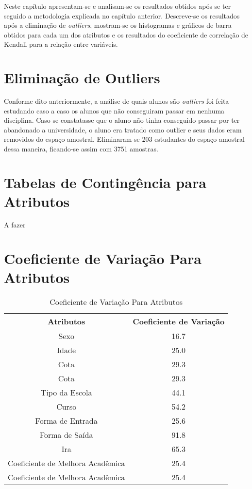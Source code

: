 Neste capítulo apresentam-se e analisam-se os resultados obtidos após se ter seguido a
metodologia explicada no capítulo anterior. Descreve-se os resultados após a
eliminação de \textit{outliers}, mostram-se os histogramas e gráficos de barra obtidos para
cada um dos atributos e os resultados do coeficiente de correlação de Kendall para a
relação entre variáveis. 

\section{Eliminação de Outliers}
Conforme dito anteriormente, a análise de quais alunos são \textit{outliers} foi feita
estudando caso a caso os alunos que não conseguiram passar em nenhuma disciplina.
Caso se constatasse que o aluno não tinha conseguido passar por ter abandonado a
universidade, o aluno era tratado como outlier e seus dados eram removidos do espaço
amostral. Eliminaram-se 203 estudantes do espaço amostral dessa maneira, ficando-se
assim com 3751 amostras. 

\section{Tabelas de Contingência para Atributos}
A fazer

\section{Coeficiente de Variação Para Atributos}

\begin{table}
\begin{center}
\begin{tabular}[c]{| c | c |}
        \hline
        \textbf{Atributos} & \textbf{Coeficiente de Variação} \\
        \hline
        Sexo & 16.7 \\
        \hline
        Idade & 25.0 \\
        \hline
        Cota & 29.3 \\
        \hline
        Cota & 29.3 \\
        \hline
        Tipo da Escola & 44.1 \\
        \hline
        Curso & 54.2 \\
        \hline
        Forma de Entrada & 25.6 \\
        \hline
        Forma de Saída & 91.8 \\
        \hline
        Ira & 65.3 \\
        \hline
        Coeficiente de Melhora Acadêmica & 25.4 \\
        \hline
        Coeficiente de Melhora Acadêmica & 25.4 \\
        \hline
\end{tabular}
\end{center}
\caption{Coeficiente de Variação Para Atributos}
\end{table}


